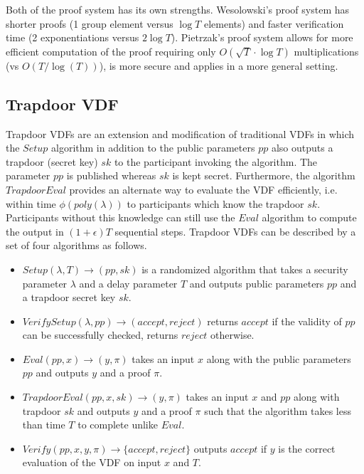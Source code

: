 \documentclass[letterpaper,twocolumn,10pt]{article}
\theoremstyle{definition}
\theoremstyle{remark}
\begin{document}
Both of the proof system has its own strengths. Wesolowski's proof system has shorter proofs (1 group element versus $\log T$ elements) and faster verification time (2 exponentiations versus $2 \log T$). Pietrzak's proof system allows for more efficient computation of the proof requiring only $O(\sqrt{T} \cdot \log T)$ multiplications (vs $O(T/\log (T))$), is more secure and applies in a more general setting.

\subsection{Trapdoor VDF}
\label{appendix:tvdf}
Trapdoor VDFs \cite{wesolowski2019efficient, schindler2021randrunner} are an extension and modification of traditional VDFs in which the $Setup$ algorithm in addition to the public parameters $pp$ also outputs a trapdoor (secret key) $sk$ to the participant invoking the algorithm.  The parameter $pp$ is published whereas $sk$ is kept secret. Furthermore, the algorithm $TrapdoorEval$ provides an alternate way to evaluate the VDF efficiently, i.e. within time $\phi{(poly{(\lambda)})}$ to participants which know the trapdoor $sk$. Participants without this knowledge can still use the $Eval$ algorithm to compute the output in $(1+\epsilon)T$ sequential steps.
Trapdoor VDFs can be described by a set of four algorithms as follows.
\begin{itemize}
    \item $Setup(\lambda, T) \rightarrow (pp, sk)$ is a randomized algorithm that takes a security parameter $\lambda$ and a delay parameter $T$ and outputs public parameters $pp$ and a trapdoor secret key $sk$.
    \item $VerifySetup(\lambda, pp) \rightarrow (accept, reject)$ returns $accept$ if the validity of $pp$ can be successfully checked, returns $reject$ otherwise.
    \item $Eval(pp, x) \rightarrow (y, \pi)$ takes an input $x$ along with the public parameters $pp$ and outputs $y$ and a proof $\pi$.
    \item $TrapdoorEval(pp,x,sk) \rightarrow (y, \pi)$ takes an input $x$ and $pp$ along with trapdoor $sk$ and outputs $y$ and a proof $\pi$ such that the algorithm takes less than time $T$ to complete unlike $Eval$.
    \item $Verify(pp, x, y, \pi) \rightarrow \{accept, reject\}$ outputs $accept$ if $y$ is the correct evaluation of the VDF on input $x$ and $T$.
\end{itemize}
\end{document}
